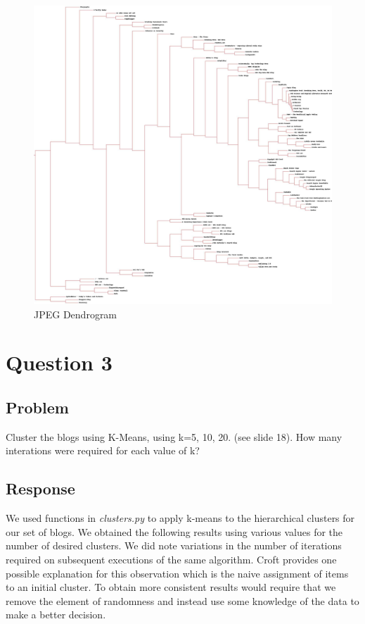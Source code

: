 \documentclass[letterpaper,11pt]{report}
\begin{document}
\begin{savenotes}
\begin{figure}
	\centering
		\includegraphics[width=1.00\textwidth]{blogclust.jpg}
	\caption{JPEG Dendrogram}
	\label{fig:blogclust}
\end{figure}

\section{Question 3}
\subsection{Problem}Cluster the blogs using K-Means, using k=5, 10, 20. (see slide 18). How many interations were required for each value of k?
\subsection{Response}We used functions in \emph{clusters.py} to apply k-means to the hierarchical clusters for our set of blogs. We obtained the following results using various values for the number of desired clusters. We did note variations in the number of iterations required on subsequent executions of the same algorithm. Croft \cite{croft2010search} provides one possible explanation for this observation which is the naive assignment of items to an initial cluster. To obtain more consistent results would require that we remove the element of randomness and instead use some knowledge of the data to make a better decision.


\end{savenotes}
\end{document}
